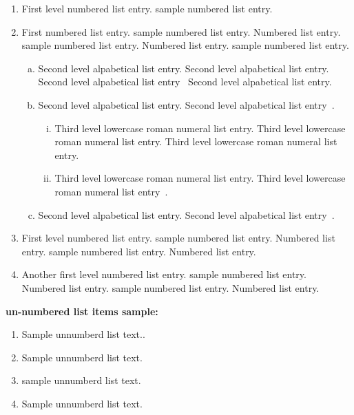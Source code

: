 \documentclass[APA,STIX1COL]{WileyNJD-v2}
\begin{document}
\begin{enumerate}[1.]
\item First level numbered list entry. sample numbered list entry. 

\item First numbered list entry. sample numbered list entry. Numbered list entry. sample numbered list entry. Numbered list entry. sample numbered list entry. 

\begin{enumerate}[a.]
\item Second level alpabetical list entry. Second level alpabetical list entry. Second level alpabetical list entry~\citet{Allen2011} Second level alpabetical list entry. 

\item Second level alpabetical list entry. Second level alpabetical list entry~\citet{Schulz2012,Allen2011,Ballen2011}.

\begin{enumerate}[ii.]
\item Third level lowercase roman numeral list entry. Third level lowercase roman numeral list entry. Third level lowercase roman numeral list entry. 

\item Third level lowercase roman numeral list entry. Third level lowercase roman numeral list entry~\cite{Yoo2007}.
\end{enumerate}

\item Second level alpabetical list entry. Second level alpabetical list entry~\cite{Elbaum2002}.
\end{enumerate}

\item First level numbered list entry. sample numbered list entry. Numbered list entry. sample numbered list entry. Numbered list entry. 

\item Another first level numbered list entry. sample numbered list entry. Numbered list entry. sample numbered list entry. Numbered list entry. 
\end{enumerate}

\noindent\textbf{un-numbered list items sample:}

\begin{enumerate}[]
\item Sample unnumberd list text..
\item Sample unnumberd list text.
\item sample unnumberd list text. 
\item Sample unnumberd list text.
\end{enumerate}
\end{document}
